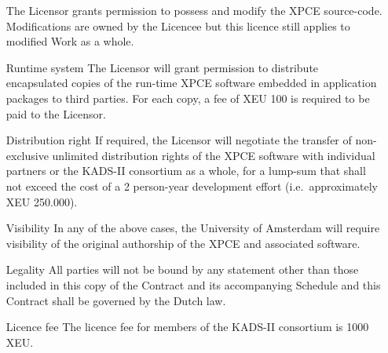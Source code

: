 \begin{enumerate}
The Licensor grants permission to possess and modify the XPCE
source-code.  Modifications are owned by the Licencee but this
licence still applies to modified Work as a whole.
    \item[Runtime system]
The Licensor will grant permission to distribute encapsulated copies of
the run-time XPCE software embedded in application packages to third
parties.  For each copy, a fee of XEU 100 is required to be paid to the
Licensor.
    \item[Distribution right]
If required, the Licensor will negotiate the transfer of non-exclusive
unlimited distribution rights of the XPCE software with individual
partners or the KADS-II consortium as a whole, for a lump-sum that shall
not exceed the cost of a 2 person-year development effort (i.e.\
approximately XEU 250.000).
    \item[Visibility]
In any of the above cases, the University of Amsterdam will require
visibility of the original authorship of the XPCE and associated
software.
    \item[Legality]
All parties will not be bound by any statement other than those included
in this copy of the Contract and its accompanying Schedule and this
Contract shall be governed by the Dutch law.
    \item[Licence fee]
The licence fee for members of the KADS-II consortium is 1000 XEU.
\end{enumerate}


